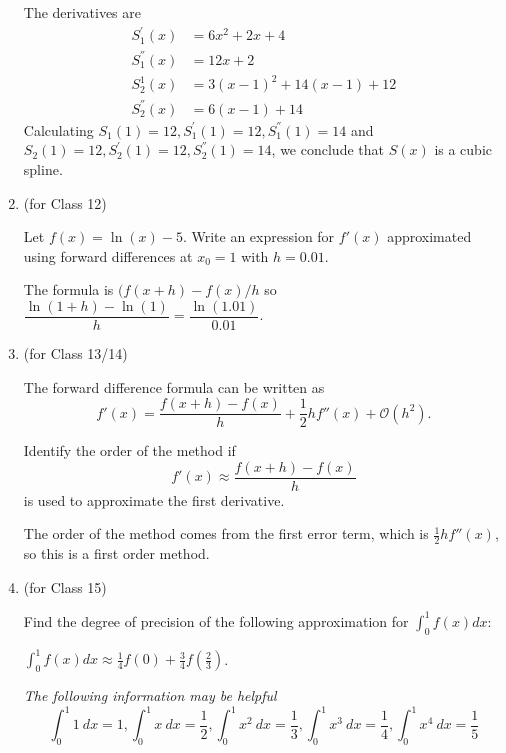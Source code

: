 \documentclass[12pt,letterpaper,answers]{exam}
\begin{document}
\begin{enumerate}
\begin{solution} The derivatives are
\begin{equation*}
\begin{aligned}
    S_1^{'}(x) &= 6x^2 + 2x + 4 \\
    S_1^{''}(x) &= 12x + 2 \\
    S_2^{1}(x) &= 3(x-1)^2 + 14(x-1) + 12 \\
    S_2^{''}(x) &= 6(x-1) + 14
\end{aligned}
\end{equation*}
Calculating $S_1(1)=12,S_1^{'}(1)=12,S_1^{''}(1)=14$ and $S_2(1)=12,S_2^{'}(1)=12,S_2^{''}(1)=14$, we conclude that $S(x)$ is a cubic spline.
\end{solution}

\item (for Class 12)

Let $f(x) = \ln(x)-5$.  Write an expression for $f'(x)$ approximated using forward differences at $x_0 = 1$ with $h = 0.01$.

\begin{solution}
 The formula is $(f(x+h) - f(x)/h$ so $\dfrac{\ln(1+h) -\ln(1)}{h}=\dfrac{\ln(1.01)}{0.01}$.
\end{solution}

\item (for Class 13/14)

The forward difference formula can be written as \[f'(x) = \dfrac{f(x+h)-f(x)}{h} + \frac{1}{2} hf''(x) + \mathcal{O}(h^2).\]  

Identify the order of the method if 
\[f'(x) \approx  \dfrac{f(x+h)-f(x)}{h}\]
is used to approximate the first derivative.

\begin{solution}
The order of the method comes from the first error term, which is $\frac{1}{2} hf''(x)$, so this is a first order method.
\end{solution}


\setcounter{enumi}{14}
\item (for Class 15)

Find the degree of precision of the following approximation for $\displaystyle\int_{0}^1 f(x)dx$:

$\displaystyle\int_{0}^1 f(x)dx\approx \frac{1}{4}f(0) + \frac{3}{4}f\left(\frac{2}{3}\right)$.

\emph{The following information may be helpful}
\[\int_{0}^1 1\ dx = 1, \int_{0}^1 x\ dx = \frac{1}{2}, \int_{0}^1 x^2\ dx = \frac{1}{3}, \int_{0}^1 x^3\ dx = \frac{1}{4}, \int_{0}^1 x^4\ dx = \frac{1}{5}\]


\end{enumerate}
\end{document}

